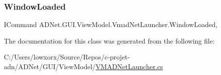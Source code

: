 \subsubsection{\texorpdfstring{Window\+Loaded}{WindowLoaded}}
{\footnotesize\ttfamily I\+Command A\+D\+Net.\+G\+U\+I.\+View\+Model.\+Vmad\+Net\+Launcher.\+Window\+Loaded\hspace{0.3cm}{\ttfamily [get]}, {\ttfamily [set]}}



The documentation for this class was generated from the following file\+:\begin{DoxyCompactItemize}
\item 
C\+:/\+Users/lowxorx/\+Source/\+Repos/c-\/projet-\/adn/\+A\+D\+Net/\+G\+U\+I/\+View\+Model/\hyperlink{_v_m_a_d_net_launcher_8cs}{V\+M\+A\+D\+Net\+Launcher.\+cs}\end{DoxyCompactItemize}
